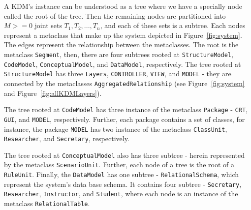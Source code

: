 A KDM's instance can be understood as a tree where we have a specially node called the root of the tree. Then the remaining nodes are partitioned into $\textit{M} >= 0$ joint sets $T_{1}, T_{2}, ..., T_{n}$, and each of these sets is a subtree.  Each nodes represent a metaclass that make up the system depicted in Figure~\ref{fig:system}. The edges represent the relationship between the metaclasses.
%
%
%
The root is the metaclass \texttt{Segment}, then, there are four subtrees rooted at \texttt{StructureModel}, \texttt{CodeModel}, \texttt{ConceptualModel}, and \texttt{DataModel}, respectively. 
The tree rooted at \texttt{StructureModel} has three \texttt{Layers}, \texttt{CONTROLLER}, \texttt{VIEW}, and \texttt{MODEL} - they are connected by the metaclasses \texttt{AggregatedRelationship} (see Figure~\ref{fig:system} and Figure~\ref{fig:allKDMLayers}).

The tree rooted at \texttt{CodeModel} has three instance of the metaclass \texttt{Package} - \texttt{CRT}, \texttt{GUI}, and \texttt{MODEL}, respectively. Further, each package contains a set of classes, for instance, the package \texttt{MODEL} has two instance of the metaclass \texttt{ClassUnit}, \texttt{Researcher}, and \texttt{Secretary}, respectively.

The tree rooted at \texttt{ConceptualModel} also has three subtree - herein represented by the metaclass \texttt{ScenarioUnit}. Further, each node of a tree is the root of a \texttt{RuleUnit}. Finally, the \texttt{DataModel} has one subtree - \texttt{RelationalSchema}, which represent the system's data base schema. It contains four subtree - \texttt{Secretary}, \texttt{Researcher}, \texttt{Instructor}, and \texttt{Student}, where each node is an instance of the metaclass \texttt{RelationalTable}.



